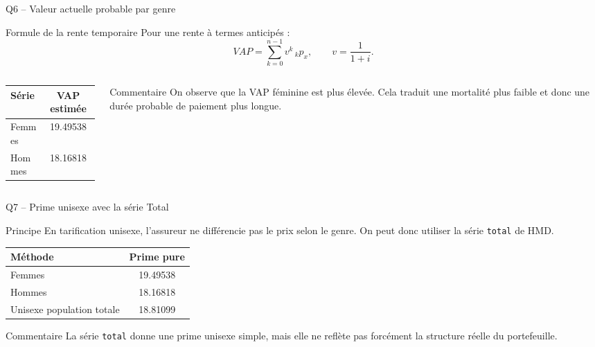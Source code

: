 \documentclass[11pt,aspectratio=169]{beamer}
\begin{document}
\begin{frame}{Q6 -- Valeur actuelle probable par genre}
  \begin{block}{Formule de la rente temporaire}
    Pour une rente à termes anticipés :
    \[
      VAP=\sum_{k=0}^{n-1} v^k\,{}_kp_x,
      \qquad v=\frac{1}{1+i}.
    \]
  \end{block}

  \vspace{0.18cm}
  \begin{columns}[T,totalwidth=\textwidth]
    \begin{column}{0.50\textwidth}
      \begin{center}
      \begin{tabular}{lc}
        \toprule
        Série & VAP estimée \\
        \midrule
        Femmes & 19.49538 \\
        Hommes & 18.16818 \\
        \bottomrule
      \end{tabular}
      \end{center}
    \end{column}

    \begin{column}{0.46\textwidth}
      \begin{block}{Commentaire}
        On observe que la VAP féminine est plus élevée. Cela traduit une mortalité plus faible et donc une durée probable de paiement plus longue.
      \end{block}
    \end{column}
  \end{columns}
\end{frame}

\begin{frame}{Q7 -- Prime unisexe avec la série Total}
  \begin{block}{Principe}
    En tarification unisexe, l'assureur ne différencie pas le prix selon le genre. On peut donc utiliser la série \texttt{total} de HMD.
  \end{block}

  \vspace{0.12cm}
  \begin{center}
  \begin{tabular}{lc}
    \toprule
    Méthode & Prime pure \\
    \midrule
    Femmes & 19.49538 \\
    Hommes & 18.16818 \\
    Unisexe population totale & 18.81099 \\
    \bottomrule
  \end{tabular}
  \end{center}

  \vspace{0.08cm}
  \begin{block}{Commentaire}
    La série \texttt{total} donne une prime unisexe simple, mais elle ne reflète pas forcément la structure réelle du portefeuille.
  \end{block}
\end{frame}
\end{document}
